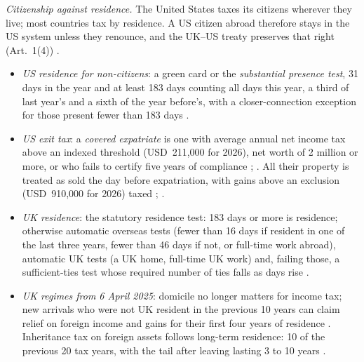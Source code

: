 \begin{qfmethod}\label{meth:residency-citizenship}
 \emph{Citizenship against residence.} The United States taxes its citizens wherever they live; most countries tax by residence. A US citizen abroad therefore stays in the US system unless they renounce, and the UK--US treaty preserves that right (Art.~1(4)) \citep[Art.~1(4)]{uk-us-double-taxation-convention-2001}.
\begin{itemize}
\item \emph{US residence for non-citizens}: a green card or the \emph{substantial presence test}, 31 days in the year and at least 183 days counting all days this year, a third of last year's and a sixth of the year before's, with a closer-connection exception for those present fewer than 183 days \citep[sec.~7701(b)(3)]{us-internal-revenue-code-26}.
\item \emph{US exit tax}: a \emph{covered expatriate} is one with average annual net income tax above an indexed threshold (USD~211,000 for 2026), net worth of 2 million or more, or who fails to certify five years of compliance \citep[sec.~877(a)(2)]{us-internal-revenue-code-26}; \citep[sec.~4.37]{irs-rev-proc-2025-32}. All their property is treated as sold the day before expatriation, with gains above an exclusion (USD~910,000 for 2026) taxed \citep[sec.~877A(a)]{us-internal-revenue-code-26}; \citep[sec.~4.38]{irs-rev-proc-2025-32}.
\item \emph{UK residence}: the statutory residence test: 183 days or more is residence; otherwise automatic overseas tests (fewer than 16 days if resident in one of the last three years, fewer than 46 days if not, or full-time work abroad), automatic UK tests (a UK home, full-time UK work) and, failing those, a sufficient-ties test whose required number of ties falls as days rise \citep[secs.~2--4, Tables A and B]{hmrc-rdr3-2026}.
\item \emph{UK regimes from 6 April 2025}: domicile no longer matters for income tax; new arrivals who were not UK resident in the previous 10 years can claim relief on foreign income and gains for their first four years of residence \citep[policy summary]{govuk-nondom-reform-2024}. Inheritance tax on foreign assets follows long-term residence: 10 of the previous 20 tax years, with the tail after leaving lasting 3 to 10 years \citep[IHTM47020]{hmrc-ihtm-2026}.

\end{itemize}
\end{qfmethod}
